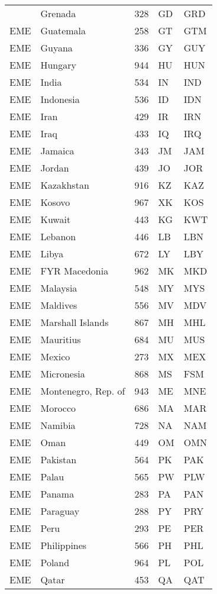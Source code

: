 \documentclass[12pt,a4paper]{article}
\begin{document}
\begin{ThreePartTable}
\begin{longtable}
{EME} & Grenada & 328 & GD & GRD \\
{EME} & Guatemala & 258 & GT & GTM \\
{EME} & Guyana & 336 & GY & GUY \\
{EME} & Hungary & 944 & HU & HUN \\
{EME} & India & 534 & IN & IND \\
{EME} & Indonesia & 536 & ID & IDN \\
{EME} & Iran & 429 & IR & IRN \\
{EME} & Iraq & 433 & IQ & IRQ \\
{EME} & Jamaica & 343 & JM & JAM \\
{EME} & Jordan & 439 & JO & JOR \\
{EME} & Kazakhstan & 916 & KZ & KAZ \\
{EME} & Kosovo & 967 & XK & KOS \\
{EME} & Kuwait & 443 & KG & KWT \\
{EME} & Lebanon & 446 & LB & LBN \\
{EME} & Libya & 672 & LY & LBY \\
{EME} & FYR Macedonia & 962 & MK & MKD \\
{EME} & Malaysia & 548 & MY & MYS \\
{EME} & Maldives & 556 & MV & MDV \\
{EME} & Marshall Islands & 867 & MH & MHL \\
{EME} & Mauritius & 684 & MU & MUS \\
{EME} & Mexico & 273 & MX & MEX \\
{EME} & Micronesia & 868 & MS & FSM \\
{EME} & Montenegro, Rep. of & 943 & ME & MNE \\
{EME} & Morocco & 686 & MA & MAR \\
{EME} & Namibia & 728 & NA & NAM \\
{EME} & Oman & 449 & OM & OMN \\
{EME} & Pakistan & 564 & PK & PAK \\
{EME} & Palau & 565 & PW & PLW \\
{EME} & Panama & 283 & PA & PAN \\
{EME} & Paraguay & 288 & PY & PRY \\
{EME} & Peru & 293 & PE & PER \\
{EME} & Philippines & 566 & PH & PHL \\
{EME} & Poland & 964 & PL & POL \\
{EME} & Qatar & 453 & QA & QAT \\

\end{longtable}
\end{ThreePartTable}
\end{document}
